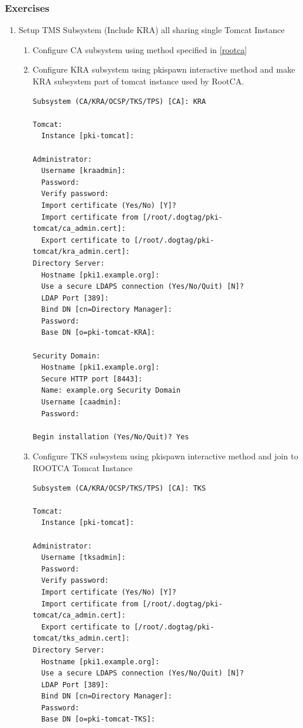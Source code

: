 \documentclass[12pt]{report}
\begin{document}
\subsubsection{Exercises}
    \begin{enumerate}[label*=\arabic*.]
        \item \label{shared_tomcat_tms}Setup TMS Subsystem (Include KRA) all sharing single Tomcat Instance
            \begin{enumerate}[label*=\arabic*.]
                \item \label{shared_ca} Configure CA subsystem using method specified in \ref{rootca}
                \item \label{shared_kra} Configure KRA subsystem using pkispawn interactive method and 
                    make KRA subsystem part of tomcat instance used by RootCA.
                    \begin{lstlisting}
Subsystem (CA/KRA/OCSP/TKS/TPS) [CA]: KRA

Tomcat:
  Instance [pki-tomcat]: 

Administrator:
  Username [kraadmin]: 
  Password: 
  Verify password: 
  Import certificate (Yes/No) [Y]? 
  Import certificate from [/root/.dogtag/pki-tomcat/ca_admin.cert]: 
  Export certificate to [/root/.dogtag/pki-tomcat/kra_admin.cert]: 
Directory Server:
  Hostname [pki1.example.org]: 
  Use a secure LDAPS connection (Yes/No/Quit) [N]? 
  LDAP Port [389]: 
  Bind DN [cn=Directory Manager]:  
  Password: 
  Base DN [o=pki-tomcat-KRA]: 

Security Domain:
  Hostname [pki1.example.org]: 
  Secure HTTP port [8443]: 
  Name: example.org Security Domain
  Username [caadmin]: 
  Password: 

Begin installation (Yes/No/Quit)? Yes
                    \end{lstlisting}
                \item \label {shared_tks} Configure TKS subsystem using pkispawn interactive method and join to 
                    ROOTCA Tomcat Instance
                    \begin{lstlisting}
Subsystem (CA/KRA/OCSP/TKS/TPS) [CA]: TKS

Tomcat:
  Instance [pki-tomcat]:

Administrator:
  Username [tksadmin]:
  Password:
  Verify password:
  Import certificate (Yes/No) [Y]?
  Import certificate from [/root/.dogtag/pki-tomcat/ca_admin.cert]:
  Export certificate to [/root/.dogtag/pki-tomcat/tks_admin.cert]:
Directory Server:
  Hostname [pki1.example.org]:
  Use a secure LDAPS connection (Yes/No/Quit) [N]?
  LDAP Port [389]:
  Bind DN [cn=Directory Manager]:
  Password:
  Base DN [o=pki-tomcat-TKS]:


\end{lstlisting}
\end{enumerate}
\end{enumerate}
\end{document}
